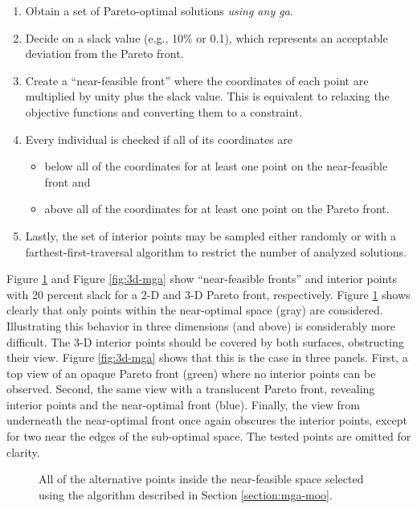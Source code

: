 \begin{enumerate}
    \item Obtain a set of Pareto-optimal solutions \textit{using any \ac{ga}}.
    \item Decide on a slack value (e.g., 10\% or 0.1), which represents an
    acceptable deviation from the Pareto front.
    \item Create a ``near-feasible front'' where the coordinates of each point
    are multiplied by unity plus the slack value. This is equivalent to relaxing
    the objective functions and converting them to a constraint. 
    \item Every individual is checked if all of its coordinates are
    \begin{itemize}
        \item below all of the coordinates for at least one point on the
        near-feasible front and
        \item above all of the coordinates for at least one point on the Pareto
        front.
    \end{itemize}  
    \item Lastly, the set of interior points may be sampled either randomly or
    with a farthest-first-traversal algorithm to restrict the number of analyzed
    solutions.
\end{enumerate}
\noindent
Figure \ref{fig:nd-mga} and Figure \ref{fig:3d-mga} show ``near-feasible
fronts'' and interior points with 20 percent slack for a 2-D and 3-D Pareto
front, respectively. Figure \ref{fig:nd-mga} shows clearly that only points
within the near-optimal space (gray) are considered. Illustrating this behavior
in three dimensions (and above) is considerably more difficult. The 3-D interior
points should be covered by both surfaces, obstructing their view. Figure
\ref{fig:3d-mga} shows that this is the case in three panels. First, a top view
of an opaque Pareto front (green) where no interior points can be observed.
Second, the same view with a translucent Pareto front, revealing interior points
and the near-optimal front (blue). Finally, the view from underneath the
near-optimal front once again obscures the interior points, except for two near
the edges of the sub-optimal space. The tested points are omitted for clarity.

\begin{figure}[h]
  \centering
  \resizebox{0.6\columnwidth}{!}{}
  \caption{All of the alternative points inside the near-feasible space selected
  using the algorithm described in Section \ref{section:mga-moo}.}
  \label{fig:nd-mga}
\end{figure}

